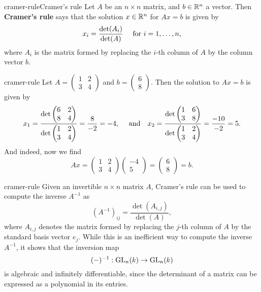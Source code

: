 \begin{topic}{cramer-rule}{Cramer's rule}
    Let $A$ be an  $n \times n$ matrix, and $b \in \mathbb{R}^n$ a vector. Then \textbf{Cramer's rule} says that the solution $x \in \mathbb{R}^n$ for $Ax = b$ is given by
    \[ x_i = \frac{\det(A_i)}{\det(A)} \quad \textup{ for } i = 1, \ldots, n, \]
    where $A_i$ is the matrix formed by replacing the $i$-th column of $A$ by the column vector $b$.
\end{topic}

\begin{example}{cramer-rule}
    Let $A = \begin{pmatrix} 1 & 2 \\ 3 & 4 \end{pmatrix}$ and $b = \begin{pmatrix} 6 \\ 8 \end{pmatrix}$. Then the solution to $Ax = b$ is given by
    \[ x_1 = \frac{\det \begin{pmatrix} 6 & 2 \\ 8 & 4 \end{pmatrix}}{\det \begin{pmatrix} 1 & 2 \\ 3 & 4 \end{pmatrix}} = \frac{8}{-2} = -4, \quad \textup{ and} \quad x_2 = \frac{\det \begin{pmatrix} 1 & 6 \\ 3 & 8 \end{pmatrix}}{\det \begin{pmatrix} 1 & 2 \\ 3 & 4 \end{pmatrix}} = \frac{-10}{-2} = 5 . \]
    And indeed, now we find
    \[ Ax = \begin{pmatrix} 1 & 2 \\ 3 & 4 \end{pmatrix} \begin{pmatrix} -4 \\ 5 \end{pmatrix} = \begin{pmatrix} 6 \\ 8 \end{pmatrix} = b . \]
\end{example}

\begin{example}{cramer-rule}
    Given an invertible $n \times n$ matrix $A$, Cramer's rule can be used to compute the inverse $A^{-1}$ as
    \[ \left( A^{-1} \right)_{ij} = \frac{\det(A_{i, j})}{\det(A)} , \]
    where $A_{i, j}$ denotes the matrix formed by replacing the $j$-th column of $A$ by the standard basis vector $e_j$. While this is an inefficient way to compute the inverse $A^{-1}$, it shows that the inversion map
    \[ (-)^{-1} : \textup{GL}_n(k) \to \textup{GL}_n(k) \]
    is algebraic and infinitely differentiable, since the determinant of a matrix can be expressed as a polynomial in its entries.
\end{example}

